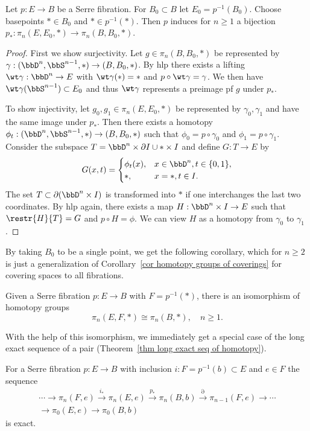 \begin{thm}\label{thm 6.3.1 tomDieck}
    Let $p:E\to B$ be a Serre fibration. For $B_0\subset B$ let $E_0=p^{-1}(B_0)$. Choose basepoints $*\in B_0$ and $* \in p^{-1}(*)$. Then $p$ induces for $n\geq 1$ a bijection $p_\ast:\pi_n(E,E_0,*)\to \pi_n(B,B_0,*)$.
\end{thm}
\begin{proof}
    First we show surjectivity. Let $g \in \pi_n(B,B_0,*)$ be represented by $\gamma:(\bbD^n,\bbS^{n-1},*)\to (B,B_0,*)$.
    By \gls{hlp} there exists a lifting $\wt\gamma:\bbD^n\to E$ with $\wt\gamma(*)=*$ and $p\circ \wt\gamma=\gamma$. We then have $\wt\gamma(\bbS^{n-1})\subset E_0$ and thus $\wt\gamma$ represents a preimage pf $g$ under $p_\ast$.

    To show injectivity, let $g_0,g_1\in \pi_n(E,E_0,*)$ be represented by $\gamma_0,\gamma_1$ and have the same image under $p_\ast$. Then there exists a homotopy $\phi_t:(\bbD^n,\bbS^{n-1},*)\to (B,B_0,*)$ such that $\phi_0=p\circ \gamma_0$ and $\phi_1=p\circ \gamma_1$. Consider the subspace $T=\bbD^n\times\partial I\cup *\times I$ and define $G:T\to E$ by 
    \[G(x,t)=
        \begin{cases}
            \phi_t(x),& x\in \bbD^n, t\in\{0,1\},\\
            *, & x=*, t\in I.
        \end{cases}
    \]
    The set $T\subset \partial(\bbD^n\times I)$ is transformed into $*$ if one interchanges the last two coordinates. By \gls{hlp} again, there exists a map $H:\bbD^n\times I\to E$ such that $\restr{H}{T}=G$ and $p\circ H=\phi$. We can view $H$ as a homotopy from $\gamma_0$ to $\gamma_1$.
\end{proof}
By taking $B_0$ to be a single point, we get the following corollary, which for $n\geq 2$ is just a generalization of Corollary~\ref{cor homotopy groups of coverings} for covering spaces to all fibrations.
\begin{cor}
    Given a Serre fibration $p:E\to B$ with $F=p^{-1}(*)$, there is an isomorphism of homotopy groups
    \[\pi_n(E,F,*)\cong \pi_n(B,*),\quad n\geq 1.\]
\end{cor}
With the help of this isomorphism, we immediately get a special case of the long exact sequence of a pair (Theorem~\ref{thm long exact seq of homotopy}).
\begin{thm}\label{thm long exact sequence of serre fibration}
    For a Serre fibration $p:E\to B$ with inclusion $i:F=p^{-1}(b)\subset E$ and $e\in F$ the sequence
    \begin{multline}
        \cdots \to \pi_n(F,e)\overset{i_\ast}{\to}\pi_n(E,e)\overset{p_\ast}{\to}\pi_n(B,b)\overset{\partial}{\to}\pi_{n-1}(F,e)\to\cdots\\ 
        \to \pi_0(E,e)\to \pi_0(B,b)
    \end{multline}
    is exact.
\end{thm}

